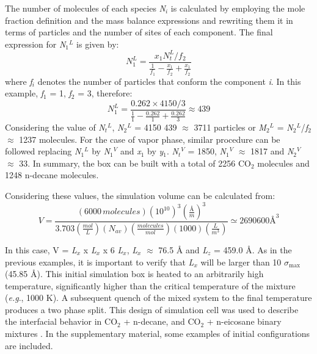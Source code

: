 \documentclass[9pt,bestpractices]{livecoms}
\begin{document}
\begin{mdframed}[linewidth=0pt,backgroundcolor=LiveCoMSLightBlue!8,fontcolor=LiveCoMSDarkBlue!80!black]
The number of molecules of each species \textit{N}$_{i}$ is calculated by
employing the mole fraction definition and the mass balance expressions and
rewriting them it in terms of particles and the number of sites of each
component. The final expression for \textit{N}$_{1}$$^{L}$ is given by:
\begin{equation}
N_{1}^{L}=\frac{x_{1}N_{t}^{L}/f_{2}}{\frac{1}{f_{1}}-\frac{x_{1}}{f_{2}}+\frac{x_{1}}{f_{2}}}
\end{equation}
where \textit{f}$_{i}$ denotes the number of particles that conform the
component \textit{i}. In this example, \textit{f}$_{1}$ = 1, \textit{f}$_{2}$
= 3, therefore:
\begin{equation}
N_{1}^{L}=\frac{0.262\times4150/3}{\frac{1}{1}-\frac{0.262}{1}+\frac{0.262}{3}}\approx439
\end{equation}
Considering the value of \textit{N}$_{t}$$^{L}$, \textit{N}$_{2}$$^{L}$ = 4150
\textendash{} 439 ${\approx}$ 3711 particles or \textit{M}$_{2}$$^{L}$
= \textit{N}$_{2}$$^{L}$/\textit{f}$_{2}$ ${\approx}$ 1237 molecules. For the
case of vapor phase, similar procedure can be followed replacing
\textit{N}$_{1}$$^{L}$ by \textit{N}$_{1}$$^{V}$ and \textit{x}$_{1}$ by
\textit{y}$_{1}$. \textit{N}$_{t}$$^{V}$ = 1850, \textit{N}$_{1}$$^{V}$
${\approx}$ 1817 and \textit{N}$_{2}$$^{V}$ ${\approx}$ 33. In summary, the box
can be built with a total of 2256 CO$_{2}$ molecules and 1248 n-decane
molecules.

Considering these values, the simulation volume can be calculated from:
\begin{equation}
V=\frac{\left(6000\,molecules\right)\left(10^{10}\right)^{3}\left(\frac{\textrm{Å}}{m}\right)^{3}}{3.703\left(\frac{mol}{L}\right)\left(N_{av}\right)\left(\frac{molecules}{mol}\right)\left(1000\right)\left(\frac{L}{m^{3}}\right)}\simeq2690600\textrm{Å}^{3}
\end{equation}

In this case, V = \textit{L}$_{x}$ x \textit{L}$_{x}$ x 6 \textit{L}$_{x}$,
\textit{L}$_{x}$ ${\approx}$ 76.5 \AA{} and \textit{L}$_{z}$ = 459.0 \AA{}. As
in the previous examples, it is important to verify that \textit{L}$_{x}$ will
be larger than 10 ${\sigma}$$_{\mathrm{max}}$ (45.85 \AA{}). This initial
simulation box is heated to an arbitrarily high temperature, significantly
higher than the critical temperature of the mixture (\textit{e.g}., 1000 K).
A subsequent quench of the mixed system to the final temperature produces a two
phase split. This design of simulation cell was used to describe the
interfacial behavior in CO$_{2}$ + n-decane, and CO$_{2}$ + n-eicosane binary
mixtures \citep{mejia2014b}. In the supplementary material, some
examples of initial configurations are included.
\end{mdframed}
\end{document}
